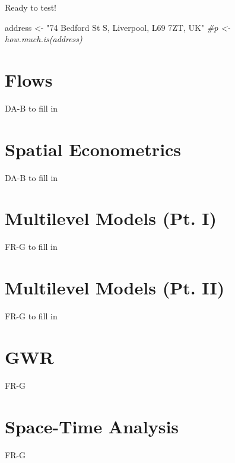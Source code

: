 \documentclass[]{book}
\newenvironment{Shaded}{\begin{snugshade}}{\end{snugshade}}
\newcommand{\CommentTok}[1]{\textcolor[rgb]{0.56,0.35,0.01}{\textit{#1}}}
\newcommand{\NormalTok}[1]{#1}
\newcommand{\StringTok}[1]{\textcolor[rgb]{0.31,0.60,0.02}{#1}}
\begin{document}
Ready to test!

\begin{Shaded}
\begin{Highlighting}[]
\NormalTok{address <-}\StringTok{ "74 Bedford St S, Liverpool, L69 7ZT, UK"}
\CommentTok{#p <- how.much.is(address)}
\end{Highlighting}
\end{Shaded}

\hypertarget{flows}{%
\chapter{Flows}\label{flows}}

DA-B to fill in

\hypertarget{spatial-econometrics}{%
\chapter{Spatial Econometrics}\label{spatial-econometrics}}

DA-B to fill in

\hypertarget{multilevel-models-pt.-i}{%
\chapter{Multilevel Models (Pt. I)}\label{multilevel-models-pt.-i}}

FR-G to fill in

\hypertarget{multilevel-models-pt.-ii}{%
\chapter{Multilevel Models (Pt. II)}\label{multilevel-models-pt.-ii}}

FR-G to fill in

\hypertarget{gwr}{%
\chapter{GWR}\label{gwr}}

FR-G

\hypertarget{space-time-analysis}{%
\chapter{Space-Time Analysis}\label{space-time-analysis}}

FR-G


\end{document}
